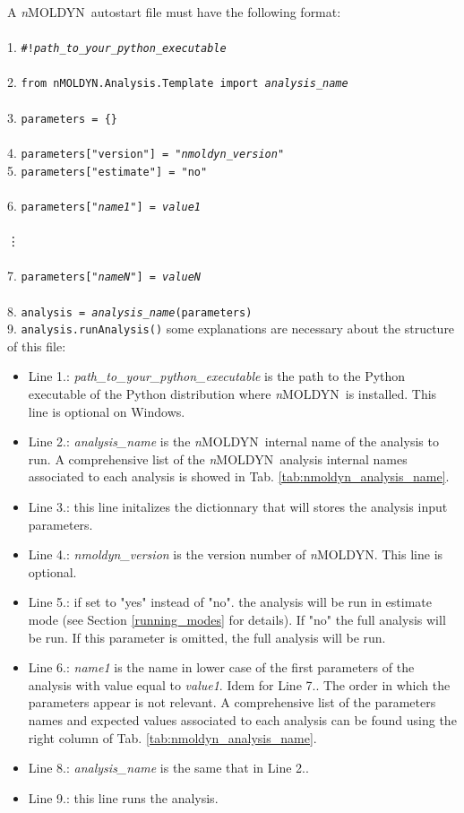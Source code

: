 \documentclass[a4paper,11pt]{report}
\newcommand{\NMOLDYN}{\textit{n}MOLDYN}
\begin{document}
\noindent A \NMOLDYN\ autostart file must have the following format:
\\\\
1. \texttt{\#!\textit{path\_to\_your\_python\_executable}}\\\\
2. \texttt{from nMOLDYN.Analysis.Template import \textit{analysis\_name}}\\\\
3. \texttt{parameters = \{\}}\\\\
4. \texttt{parameters["version"] = "\textit{nmoldyn\_version}"}\\
5. \texttt{parameters["estimate"] = "no"}\\\\
6. \texttt{parameters["\textit{name1}"] = \textit{value1}}
\\\\
\vdots
\\\\
7. \texttt{parameters["\textit{nameN}"] = \textit{valueN}}\\\\
8. \texttt{analysis = \textit{analysis\_name}(parameters)}\\
9. \texttt{analysis.runAnalysis()}
\newpage
\noindent some explanations are necessary about the structure of this file:
\begin{itemize}
\item Line 1.: \textit{path\_to\_your\_python\_executable} is the path to the Python executable of the Python distribution 
where \NMOLDYN\ is installed. This line is optional on Windows.
\item Line 2.: \textit{analysis\_name} is the \NMOLDYN\ internal name of the analysis to run. A comprehensive list of the 
\NMOLDYN\ analysis internal names associated to each analysis is showed in Tab. \ref{tab:nmoldyn_analysis_name}.
\item Line 3.: this line initalizes the dictionnary that will stores the analysis input parameters.
\item Line 4.: \textit{nmoldyn\_version} is the version number of \NMOLDYN . This line is optional.
\item Line 5.: if set to "yes" instead of "no". the analysis will be run in estimate mode (see Section \ref{running_modes} 
for details). If "no" the full analysis will be run. If this parameter is omitted, the full analysis will be run.
\item Line 6.: \textit{name1} is the name in lower case of the first parameters of the analysis with value equal to \textit{value1}. 
Idem for Line 7.. The order in which the parameters appear is not relevant. A comprehensive list of the parameters names and 
expected values associated to each analysis can be found using the right column of Tab. \ref{tab:nmoldyn_analysis_name}.
\item Line 8.: \textit{analysis\_name} is the same that in Line 2..
\item Line 9.: this line runs the analysis.
\end{itemize}
\end{document}
